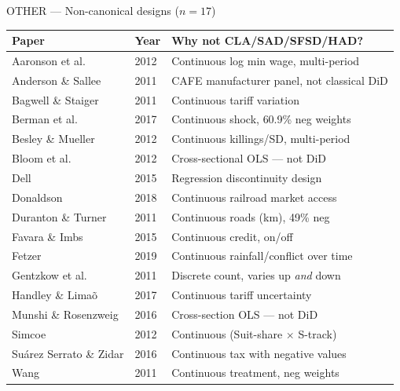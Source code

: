 \documentclass[10pt,aspectratio=169]{beamer}
\begin{document}
\begin{frame}{\textcolor{otherColor}{OTHER} --- Non-canonical designs ($n=17$)}
\scriptsize
\begin{tabular}{lll}
\toprule
\textbf{Paper} & \textbf{Year} & \textbf{Why not CLA/SAD/SFSD/HAD?} \\
\midrule
Aaronson et al.            & 2012 & Continuous log min wage, multi-period \\
Anderson \& Sallee         & 2011 & CAFE manufacturer panel, not classical DiD \\
Bagwell \& Staiger         & 2011 & Continuous tariff variation \\
Berman et al.              & 2017 & Continuous shock, 60.9\% neg weights \\
Besley \& Mueller          & 2012 & Continuous killings/SD, multi-period \\
Bloom et al.               & 2012 & Cross-sectional OLS --- not DiD \\
Dell                       & 2015 & Regression discontinuity design \\
Donaldson                  & 2018 & Continuous railroad market access \\
Duranton \& Turner         & 2011 & Continuous roads (km), 49\% neg \\
Favara \& Imbs             & 2015 & Continuous credit, on/off \\
Fetzer                     & 2019 & Continuous rainfall/conflict over time \\
Gentzkow et al.            & 2011 & Discrete count, varies up \emph{and} down \\
Handley \& Lima\~o         & 2017 & Continuous tariff uncertainty \\
Munshi \& Rosenzweig       & 2016 & Cross-section OLS --- not DiD \\
Simcoe                     & 2012 & Continuous (Suit-share $\times$ S-track) \\
Su\'arez Serrato \& Zidar  & 2016 & Continuous tax with negative values \\
Wang                       & 2011 & Continuous treatment, neg weights \\
\bottomrule
\end{tabular}
\end{frame}
\end{document}
